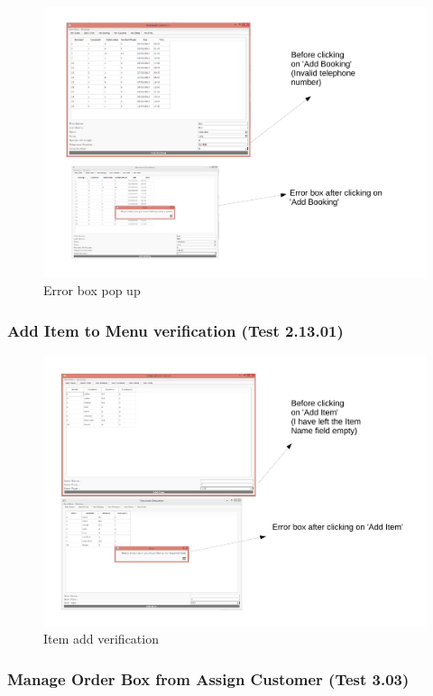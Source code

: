 \begin{landscape}
\begin{figure}[H]
    \includegraphics[width = 20cm]{./Testing/images/test13}
    \caption{Error box pop up} \label{fig:Test13}
\end{figure}



\subsubsection{Add Item to Menu verification (Test 2.13.01)}

\begin{figure}[H]
    \includegraphics[width = 20cm]{./Testing/images/test11}
    \caption{Item add verification} \label{fig:Test11}
\end{figure}

\subsubsection{Manage Order Box from Assign Customer (Test 3.03) }


\end{landscape}
